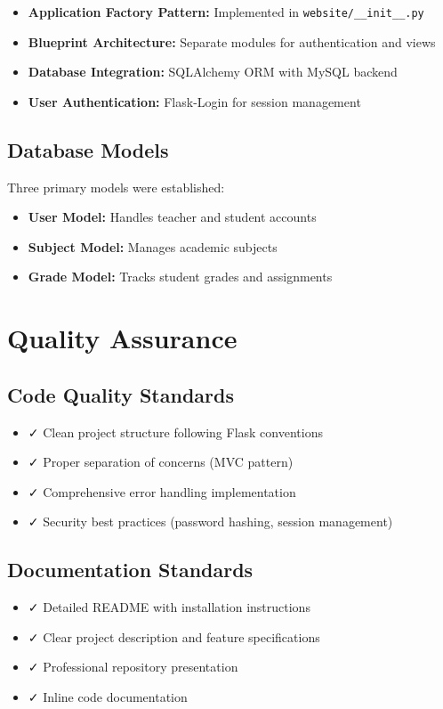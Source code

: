 \documentclass[12pt,a4paper]{article}
\begin{document}
\begin{itemize}
    \item \textbf{Application Factory Pattern:} Implemented in \texttt{website/\_\_init\_\_.py}
    \item \textbf{Blueprint Architecture:} Separate modules for authentication and views
    \item \textbf{Database Integration:} SQLAlchemy ORM with MySQL backend
    \item \textbf{User Authentication:} Flask-Login for session management
\end{itemize}

\subsection{Database Models}
Three primary models were established:
\begin{itemize}
    \item \textbf{User Model:} Handles teacher and student accounts
    \item \textbf{Subject Model:} Manages academic subjects
    \item \textbf{Grade Model:} Tracks student grades and assignments
\end{itemize}

\section{Quality Assurance}

\subsection{Code Quality Standards}
\begin{itemize}
    \item ✓ Clean project structure following Flask conventions
    \item ✓ Proper separation of concerns (MVC pattern)
    \item ✓ Comprehensive error handling implementation
    \item ✓ Security best practices (password hashing, session management)
\end{itemize}

\subsection{Documentation Standards}
\begin{itemize}
    \item ✓ Detailed README with installation instructions
    \item ✓ Clear project description and feature specifications
    \item ✓ Professional repository presentation
    \item ✓ Inline code documentation
\end{itemize}
\end{document}
